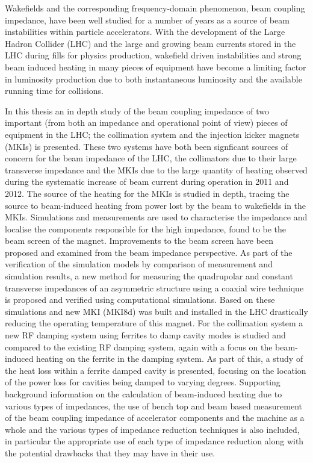 Wakefields and the corresponding frequency-domain phenomenon, beam coupling impedance, have been well studied for a number of years as a source of beam instabilities within particle accelerators. With the development of the Large Hadron Collider (LHC) and the large and growing beam currents stored in the LHC during fills for physics production, wakefield driven instabilities and strong beam induced heating in many pieces of equipment have become a limiting factor in luminosity production due to both instantaneous luminosity and the available running time for collisions.

In this thesis an in depth study of the beam coupling impedance of two important (from both an impedance and operational point of view) pieces of equipment in the LHC; the collimation system and the injection kicker magnets (MKIs) is presented. These two systems have both been signficant sources of concern for the beam impedance of the LHC, the collimators due to their large transverse impedance and the MKIs due to the large quantity of heating observed during the systematic increase of beam current during operation in 2011 and 2012. The source of the heating for the MKIs is studied in depth, tracing the source to beam-induced heating from power lost by the beam to wakefields in the MKIs. Simulations and measurements are used to characterise the impedance and localise the components responsible for the high impedance, found to be the beam screen of the magnet. Improvements to the beam screen have been proposed and examined from the beam impedance perspective. As part of the verification of the simulation models by comparison of measurement and simulation results, a new method for measuring the quadrupolar and constant transverse impedances of an asymmetric structure using a coaxial wire technique is proposed and verified using computational simulations. Based on these simulations and new MKI (MKI8d) was built and installed in the LHC drastically reducing the operating temperature of this magnet. For the collimation system a new RF damping system using ferrites to damp cavity modes is studied and compared to the existing RF damping system, again with a focus on the beam-induced heating on the ferrite in the damping system. As part of this, a study of the heat loss within a ferrite damped cavity is presented, focusing on the location of the power loss for cavities being damped to varying degrees. Supporting background information on the calculation of beam-induced heating due to various types of impedances, the use of bench top and beam based measurement of the beam coupling impedance of accelerator components and the machine as a whole and the various types of impedance reduction techniques is also included, in particular the appropriate use of each type of impedance reduction along with the potential drawbacks that they may have in their use.